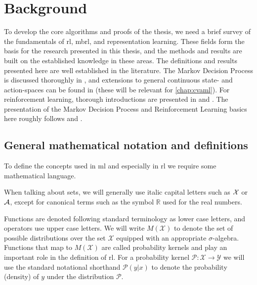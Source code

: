 \chapter{Background}
\label{chap:background}


To develop the core algorithms and proofs of the thesis, we need a brief survey of the fundamentals of \ac{rl}, \ac{mbrl}, and representation learning.
These fields form the basis for the research presented in this thesis, and the methods and results are built on the established knowledge in these areas.
The definitions and results presented here are well established in the literature.
The Markov Decision Process is discussed thoroughly in \parencite{puterman1994markov}, and extensions to general continuous state- and action-spaces can be found in \textcite{bertsekasshreve1978} (these will be relevant for \autoref{chap:cvaml}).
For reinforcement learning, thorough introductions are presented in \textcite{suttonbook} and \textcite{Farahmand2021}.
The presentation of the Markov Decision Process and Reinforcement Learning basics here roughly follows \textcite{farahmand2011thesis} and \textcite{Farahmand2021}.


\section{General mathematical notation and definitions}
To define the concepts used in \ac{ml} and especially in \ac{rl} we require some mathematical language.

When talking about sets, we will generally use italic capital letters such as $\mathcal{X}$ or $\mathcal{A}$, except for canonical terms such as the symbol $\mathbb{R}$ used for the real numbers.

Functions are denoted following standard terminology as lower case letters, and operators use upper case letters.
We will write $M(\mathcal{X})$ to denote the set of possible distributions over the set $\mathcal{X}$ equipped with an appropriate $\sigma$-algebra.
Functions that map to $M(\mathcal{X})$ are called probability kernels and play an important role in the definition of \ac{rl}.
For a probability kernel $\mathcal{P}: \mathcal{X} \rightarrow \mathcal{Y}$ we will use the standard notational shorthand $\mathcal{P}(y|x)$ to denote the probability (density) of $y$ under the distribution $\mathcal{P}$.

